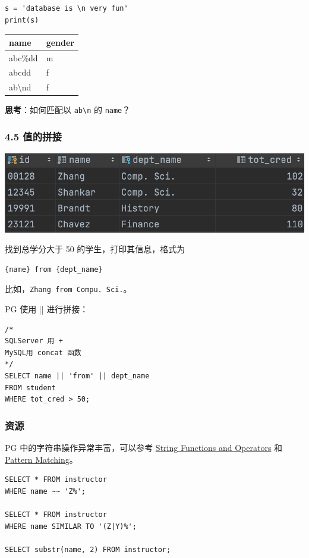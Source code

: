 \documentclass[aspectratio=169, 14pt]{beamer}
\begin{document}
\begin{frame}[fragile]
    \begin{verbatim} 
s = 'database is \n very fun'
print(s)
    \end{verbatim}
    \pause
    \begin{table}
        \begin{tabular}{ll}
          \toprule
          name & gender \\
          \midrule
          abc\%dd & m \\
          abcdd & f \\
          ab\textbackslash nd & f \\
          \bottomrule
        \end{tabular}
    \end{table}
\textbf{思考}：如何匹配以 \texttt{ab\textbackslash n} 的 \texttt{name}？
\end{frame}

\begin{frame}[fragile]
    \frametitle{4.5 值的拼接}
\includegraphics[width=.8\textwidth]{week4/cred}    

找到总学分大于 50 的学生，打印其信息，格式为

\begin{verbatim}
{name} from {dept_name}    
\end{verbatim}

比如，\texttt{Zhang from Compu. Sci.}。
\end{frame}

\begin{frame}[fragile]
PG 使用 \alert{||} 进行拼接：
    \begin{verbatim} 
/*
SQLServer 用 +
MySQL用 concat 函数
*/
SELECT name || 'from' || dept_name
FROM student
WHERE tot_cred > 50;
    \end{verbatim}

\end{frame}

\begin{frame}[fragile]
    \frametitle{资源}
PG 中的字符串操作异常丰富，可以参考 \href{https://www.postgresql.org/docs/14/functions-string.html}{String Functions and Operators} 和 \href{https://www.postgresql.org/docs/14/functions-matching.html}{Pattern Matching}。

\begin{verbatim} 
SELECT * FROM instructor
WHERE name ~~ 'Z%';

SELECT * FROM instructor
WHERE name SIMILAR TO '(Z|Y)%';

SELECT substr(name, 2) FROM instructor;
\end{verbatim}

\end{frame}
\end{document}
